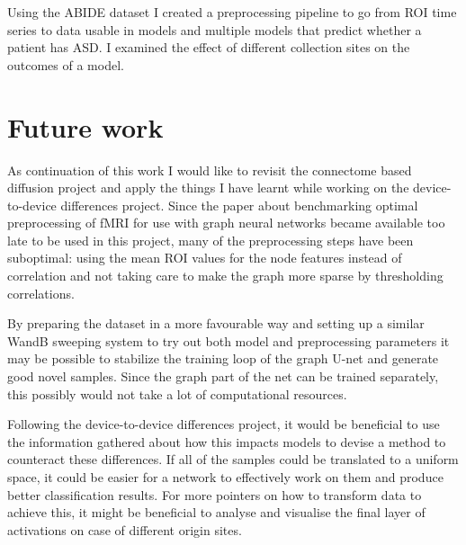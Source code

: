 Using the ABIDE dataset I created a preprocessing pipeline to go from ROI time series to data usable in models and multiple models that predict whether a patient has ASD. I examined the effect of different collection sites on the outcomes of a model.

\section{Future work}

As continuation of this work I would like to revisit the connectome based diffusion project and apply the things I have learnt while working on the device-to-device differences project. Since the paper about benchmarking optimal preprocessing of fMRI for use with graph neural networks \cite{said2023neurograph} became available too late to be used in this project, many of the preprocessing steps have been suboptimal: using the mean ROI values for the node features instead of correlation and not taking care to make the graph more sparse by thresholding correlations.

By preparing the dataset in a more favourable way and setting up a similar WandB sweeping system to try out both model and preprocessing parameters it may be possible to stabilize the training loop of the graph U-net and generate good novel samples. Since the graph part of the net can be trained separately, this possibly would not take a lot of computational resources.

Following the device-to-device differences project, it would be beneficial to use the information gathered about how this impacts models to devise a method to counteract these differences. If all of the samples could be translated to a uniform space, it could be easier for a network to effectively work on them and produce better classification results. For more pointers on how to transform data to achieve this, it might be beneficial to analyse and visualise the final layer of activations on case of different origin sites.

